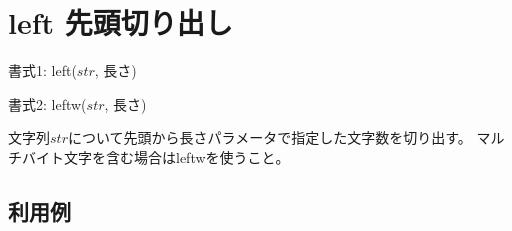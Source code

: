 
%

\section{left 先頭切り出し\label{sect:left}}

書式1: left($str$, 長さ)

書式2: leftw($str$, 長さ)

文字列$str$について先頭から長さパラメータで指定した文字数を切り出す。
マルチバイト文字を含む場合はleftwを使うこと。

\subsection*{利用例}


%

